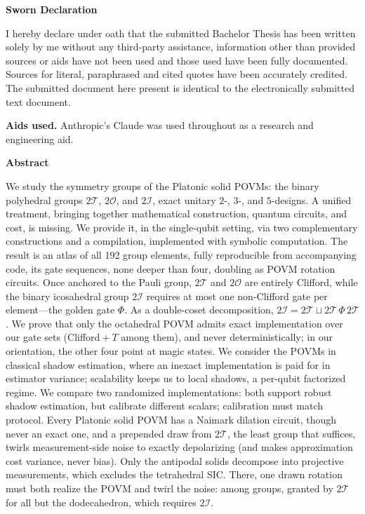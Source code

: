 \documentclass[11pt, oneside, openany]{scrbook}
\newcommand{\Tgroup}{\mathcal{T}}  %
\newcommand{\Ogroup}{\mathcal{O}}  %
\newcommand{\Igroup}{\mathcal{I}}  %
\newcommand{\TwoT}{2\Tgroup}
\newcommand{\TwoO}{2\Ogroup}
\newcommand{\TwoI}{2\Igroup}
\begin{document}
\thispagestyle{empty}

\begin{center}\bfseries\Large Sworn Declaration\end{center}

\bigskip

\noindent I hereby declare under oath that the submitted Bachelor Thesis has been written solely by me without any third-party assistance, information other than provided sources or aids have not been used and those used have been fully documented. Sources for literal, paraphrased and cited quotes have been accurately credited. The submitted document here present is identical to the electronically submitted text document.

\bigskip

\noindent\textbf{Aids used.} Anthropic's Claude was used throughout as a research and engineering aid.

\clearpage

\begin{center}\bfseries\Large Abstract\end{center}


\bigskip

We study the symmetry groups of the Platonic solid POVMs: the binary polyhedral groups $\TwoT$, $\TwoO$, and $\TwoI$, exact unitary $2$-, $3$-, and $5$-designs. A unified treatment, bringing together mathematical construction, quantum circuits, and cost, is missing. We provide it, in the single-qubit setting, via two complementary constructions and a compilation, implemented with symbolic computation. The result is an atlas of all 192 group elements, fully reproducible from accompanying code, its gate sequences, none deeper than four, doubling as POVM rotation circuits. Once anchored to the Pauli group, $\TwoT$ and $\TwoO$ are entirely Clifford, while the binary icosahedral group $\TwoI$ requires at most one non-Clifford gate per element---the golden gate $\Phi$. As a double-coset decomposition, $\TwoI = \TwoT \sqcup \TwoT\,\Phi\,\TwoT$. We prove that only the octahedral POVM admits exact implementation over our gate sets (Clifford${}+T$ among them), and never deterministically; in our orientation, the other four point at magic states. We consider the POVMs in classical shadow estimation, where an inexact implementation is paid for in estimator variance; scalability keeps us to local shadows, a per-qubit factorized regime. We compare two randomized implementations: both support robust shadow estimation, but calibrate different scalars; calibration must match protocol. Every Platonic solid POVM has a Naimark dilation circuit, though never an exact one, and a prepended draw from $\TwoT$, the least group that suffices, twirls measurement-side noise to exactly depolarizing (and makes approximation cost variance, never bias). Only the antipodal solids decompose into projective measurements, which excludes the tetrahedral SIC. There, one drawn rotation must both realize the POVM and twirl the noise: among groups, granted by $\TwoT$ for all but the dodecahedron, which requires $\TwoI$.
\end{document}
